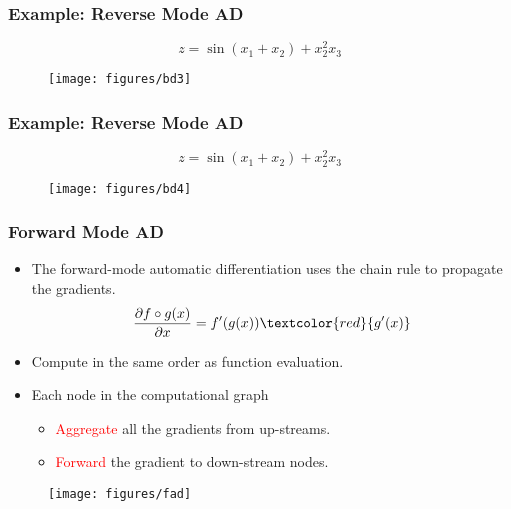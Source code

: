 \documentclass[usenames,dvipsnames]{beamer}
\newcommand{\red}[1]{\textcolor{red}{#1}}
\begin{document}
\begin{frame}
\frametitle{Example: Reverse Mode AD}	
$$z=\sin(x_1+x_2) + x_2^2x_3$$
\begin{figure}[hbt]
\centering
  \texttt{[image: figures/bd3]}
\end{figure}
\end{frame}

\begin{frame}
\frametitle{Example: Reverse Mode AD}	
$$z=\sin(x_1+x_2) + x_2^2x_3$$
\begin{figure}[hbt]
\centering
  \texttt{[image: figures/bd4]}
\end{figure}
\end{frame}

\begin{frame}
	\frametitle{Forward Mode AD}

	\begin{itemize}
	\item The forward-mode automatic differentiation uses the chain rule to propagate the gradients. 
	$$\frac{\partial f\circ g (x)}{\partial x} =  f'(g(x)) \red{ g'(x)}$$
		\item Compute in the same order as function evaluation. 
		\item Each node in the computational graph
		\begin{itemize}
		\item \red{Aggregate} all the gradients from up-streams. 
		\item \red{Forward} the gradient to down-stream nodes.  
		\end{itemize} 
	\end{itemize}
	
	\begin{figure}[hbt]
  \texttt{[image: figures/fad]}
\end{figure}
	
	
\end{frame}
\end{document}
